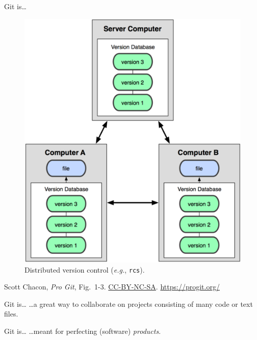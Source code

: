 \begin{frame}{Git is\ldots}
  \begin{figure}
    \includegraphics[scale=0.8]{18333fig0103-tn.png}
    \\ Distributed version control (\emph{e.g.}, \texttt{rcs}).
  \end{figure}
  \footnotesize{Scott Chacon,
    \emph{Pro Git},
    Fig.~1-3.
    \href{https://creativecommons.org/licenses/by-nc-sa/3.0/legalcode}{CC-BY-NC-SA}.
    \href{https://progit.org/}{https://progit.org/}}

\end{frame}

\begin{frame}{Git is\ldots}
  \hangindent=30pt \Huge {
  \ldots a great way to collaborate on projects consisting of
    many code or text files.
  }
\end{frame}

\begin{frame}{Git is\ldots}
  \hangindent=30pt \Huge {
  \ldots meant for perfecting (software) \emph{products}.
  }
\end{frame}


